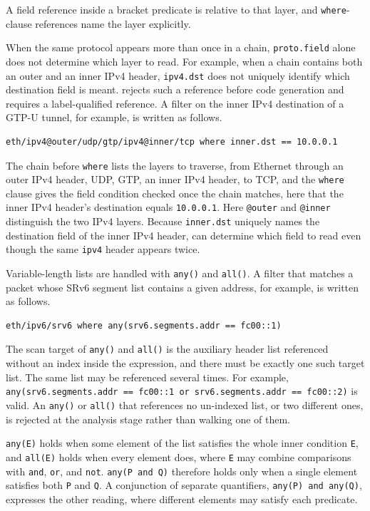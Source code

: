 A field reference inside a bracket predicate is relative to that
layer, and \texttt{where}-clause references name the layer
explicitly.

When the same protocol appears more than once in a chain,
\texttt{proto.field} alone does not determine which layer to read.
For example, when a chain contains both an outer and an inner IPv4 header,
\texttt{ipv4.dst} does not uniquely identify which destination field
is meant. \kunai rejects such a reference before code generation and
requires a label-qualified reference. A filter on the inner IPv4
destination of a GTP-U tunnel, for example, is written as follows.

\begin{lstlisting}[style=kunai]
eth/ipv4@outer/udp/gtp/ipv4@inner/tcp where inner.dst == 10.0.0.1
\end{lstlisting}

The chain before \texttt{where} lists the layers to traverse, from
Ethernet through an outer IPv4 header, UDP, GTP, an inner IPv4 header,
to TCP, and the \texttt{where} clause gives the field condition checked
once the chain matches, here that the inner IPv4 header's destination
equals \texttt{10.0.0.1}. Here \texttt{@outer} and \texttt{@inner}
distinguish the two IPv4 layers. Because \texttt{inner.dst} uniquely
names the destination field of the inner IPv4 header, \kunai can
determine which field to read even though the same \texttt{ipv4}
header appears twice.

Variable-length lists are handled with \texttt{any()} and
\texttt{all()}. A filter that matches a packet whose SRv6 segment list
contains a given address, for example, is written as follows.

\begin{lstlisting}[style=kunai]
eth/ipv6/srv6 where any(srv6.segments.addr == fc00::1)
\end{lstlisting}

The scan target of \texttt{any()} and \texttt{all()} is the auxiliary
header list referenced without an index inside the expression, and
there must be exactly one such target list. The same list may be
referenced several times. For example,
\texttt{any(srv6.segments.addr == fc00::1 or srv6.segments.addr ==
fc00::2)} is valid. An \texttt{any()} or \texttt{all()} that references no un-indexed list, or
two different ones, is rejected at the analysis stage rather than
walking one of them.

\texttt{any(E)} holds when some element of the list satisfies the
whole inner condition \texttt{E}, and \texttt{all(E)} holds when
every element does, where \texttt{E} may combine comparisons with
\texttt{and}, \texttt{or}, and \texttt{not}. \texttt{any(P and Q)}
therefore holds only when a single element satisfies both \texttt{P}
and \texttt{Q}. A conjunction of separate quantifiers, \texttt{any(P)
and any(Q)}, expresses the other reading, where different elements may
satisfy each predicate.


